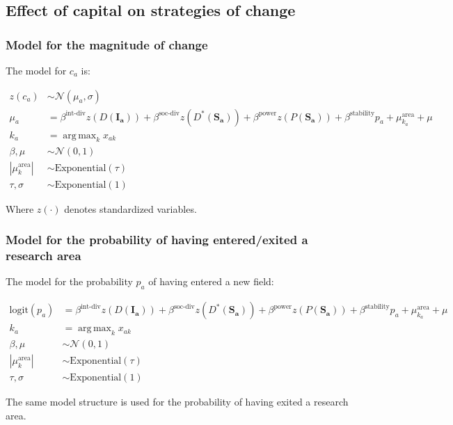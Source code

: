 \documentclass{article}
\DeclareMathOperator*{\argmax}{arg\,max}
\begin{document}
\subsection{Effect of capital on strategies of change}

\subsubsection{\label{appendix:change-model}Model for the magnitude of change}

The model for $c_a$ is:

\begin{align*}
    z(c_a) &\sim \mathcal{N}(\mu_a,\sigma)\\
    \mu_a &= \beta^{\text{int-div}} z(D(\bm{I_a}))+\beta^{\text{soc-div}}z(D^{\ast}(\bm{S_a})) + \beta^{\text{power}} z(P(\bm{S_a})) + \beta^{\text{stability}} p_a   + \mu^{\text{area}}_{k_a} + \mu\\
    k_a &= \argmax_k x_{ak}\\
    \beta,\mu &\sim \mathcal{N}(0, 1)\\
    |\mu^{\text{area}}_k| &\sim \mathrm{Exponential}(\tau)\\
    \tau,\sigma &\sim \mathrm{Exponential}(1)
\end{align*}

Where $z(\cdot)$ denotes standardized variables.

\subsubsection{\label{appendix:enter-exit-model}Model for the probability of having  entered/exited a research area}

The model for the probability $p_a$ of having entered a new field:

\begin{align*}
    \mathrm{logit}(p_a) &= \beta^{\text{int-div}} z(D(\bm{I_a}))+\beta^{\text{soc-div}}z(D^{\ast}(\bm{S_a})) + \beta^{\text{power}} z(P(\bm{S_a})) + \beta^{\text{stability}} p_a   + \mu^{\text{area}}_{k_a} + \mu\\
    k_a &= \argmax_k x_{ak}\\
    \beta,\mu &\sim \mathcal{N}(0, 1)\\
    |\mu^{\text{area}}_k| &\sim \mathrm{Exponential}(\tau)\\
    \tau,\sigma &\sim \mathrm{Exponential}(1)
\end{align*}

The same model structure is used for the probability of having exited a research area.
\end{document}
